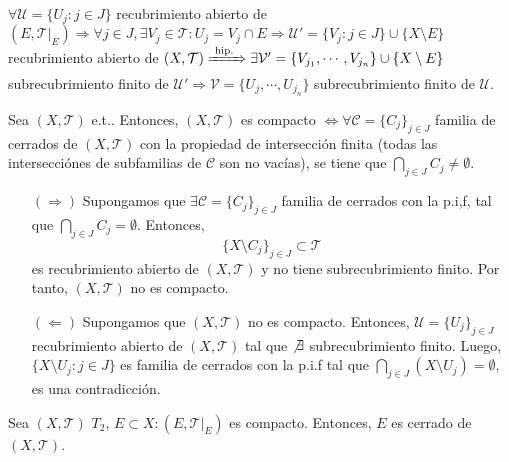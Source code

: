  \begin{dem}
   $\forall \mathcal{U} = \{ U_{j} : j \in J \}$ recubrimiento abierto de $( E, \mathcal{T}|_{E}) \Rightarrow \forall j \in J, \exists V_{j} \in \mathcal{T} :  U_{j} = V_{j} \cap E \Rightarrow \mathcal{U}' = \{ V_{j} : j \in J \} \cup \{  X \setminus E \}$ recubrimiento abierto de $( X, \mathcal{T} ) \xRightarrow[]{ \text{ hip. } } \exists \mathcal{V}' = \{  V_{j_{1}}, \cdots, V_{j_{n}} \} \cup \{  X \setminus E \}$ subrecubrimiento finito de $\mathcal{U'} \Rightarrow \mathcal{V} = \{ U_{j}, \cdots, U_{j_{n}} \}$ subrecubrimiento finito de $\mathcal{U}$.
 \end{dem}

 \begin{prop}
   Sea $( X, \mathcal{T} )$ e.t.. Entonces, $( X, \mathcal{T} )$ es compacto $ \Leftrightarrow \forall \mathcal{C} = \{ C_{j} \}_{j \in J}$ familia de cerrados de $( X, \mathcal{T} )$ con la propiedad de intersección finita (todas las intersecciónes de subfamilias de $\mathcal{C}$ son no vacías), se tiene que $\bigcap_{j \in J} C_{j} \neq \emptyset$.
 \end{prop}

 \begin{dem}
   \begin{enumerate}[label=(\roman*)]
     \item []
     \item [$(\Rightarrow)$] Supongamos que $\exists \mathcal{C} = \{ C_{j} \}_{j \in J}$ familia de cerrados con la p.i,f, tal que $\bigcap_{j \in J} C_{j} = \emptyset$. Entonces,
       \[
         \{ X \setminus C_{j} \}_{j \in J} \subset \mathcal{T}
       \]
       es recubrimiento abierto de $( X, \mathcal{T} )$ y no tiene subrecubrimiento finito. Por tanto, $( X, \mathcal{T} )$ no es compacto.
       
     \item [$(\Leftarrow)$] Supongamos que $( X, \mathcal{T} )$ no es compacto. Entonces, $\mathcal{U} = \{ U_{j} \}_{j \in J}$ recubrimiento abierto de $( X, \mathcal{T} )$ tal que $\not\exists$ subrecubrimiento finito. Luego, $\{ X \setminus U_{j} : j \in J \}$ es familia de cerrados con la p.i.f tal que $\bigcap_{j \in J}(X \setminus U_{j}) = \emptyset$, es una contradicción.
   \end{enumerate}
 \end{dem}

 \begin{prop}
   Sea $( X, \mathcal{T} )$ $T_{2}$, $E \subset X : ( E, \mathcal{T}|_{E})$ es compacto. Entonces, $E$ es cerrado de $( X, \mathcal{T} )$.
 \end{prop}
